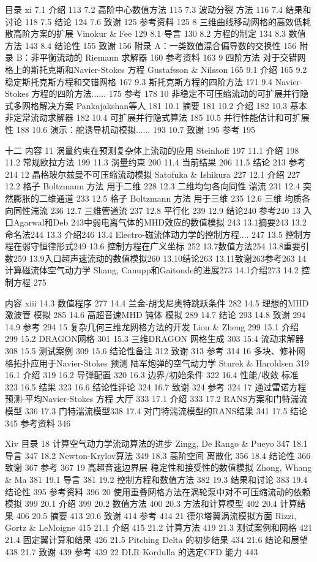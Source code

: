\documentclass[UTF8,11pt,a4paper,openany,fontset=fandol]{ctexbook}
\begin{document}
目录 xi 7.1 介绍 113 7.2 高阶中心数值方法 115 7.3 波动分裂 方法 116 7.4 结果和讨论 118 7.5 结论 124 7.6 致谢 125 参考资料 125 8 三维曲线移动网格的高效低耗散高阶方案的扩展 Vinokur \& Fee 129 8.1 导言 130 8.2 方程的制定 134 8.3 数值方法 143 8.4 结论性 155 致谢 156 附录 A：一类数值混合偏导数的交换性 156 附录 B：非平衡流动的 Riemann 求解器 160 参考资料 163 9 四阶方法 对于交错网格上的斯托克斯和Navier-Stokes 方程 Gustafsson \& Nilsson 165 9.1 介绍 165 9.2 稳定斯托克斯方程和交错网格 167 9.3 斯托克斯方程的四阶方法 171 9.4 Navier-Stokes 方程的四阶方法...... 175 参考 178 10 非稳定不可压缩流动的可扩展并行隐式多网格解决方案 Pankajakshan等人 181 10.1 摘要 181 10.2 介绍 182 10.3 基本非定常流动求解器 182 10.4 可扩展并行隐式算法 185 10.5 并行性能估计和可扩展性 188 10.6 演示：舵诱导机动模拟...... 193 10.7 致谢 195 参考 195

十二 内容 11 涡量约束在预测复杂体上流动的应用 Steinhoff 197 11.1 介绍 198 11.2 常规欧拉方法 199 11.3 涡量约束 200 11.4 当前结果 206 11.5 结论 213 参考 214 12 晶格玻尔兹曼不可压缩流动模拟 Satofuka \& Ishikura 227 12.1 介绍 227 12.2 格子 Boltzmann 方法 用于二维 228 12.3 二维均匀各向同性 湍流 231 12.4 突然膨胀的二维通道 233 12.5 格子 Boltzmann 方法 用于三维 235 12.6 三维 均质各向同性湍流 236 12.7 三维管道流 237 12.8 平行化 239 12.9 结论240 参考240 13 入口Agarwal和Deb 243中弱电离气体的MHD效应的数值模拟 243 13.1摘要243 13.2命名法244 13.3 介绍246 13.4 Electro-磁流体动力学的控制方程.... 247 13.5 控制方程在弱守恒律形式249 13.6 控制方程在广义坐标 252 13.7数值方法254 13.8重要引数259 13.9入口超声速流动的数值模拟260 13.10结论263 13.11致谢263参考263 14 计算磁流体空气动力学 Shang, Canupp和Gaitonde的进展273 14.1介绍273 14.2 控制方程 275

内容 xiii 14.3 数值程序 277 14.4 兰金-胡戈尼奥特跳跃条件 282 14.5 理想的MHD 激波管 模拟 285 14.6 高超音速MHD 钝体 模拟 289 14.7 结论 293 14.8 致谢 294 14.9 参考 294 15 复杂几何三维龙网格方法的开发 Liou \& Zheng 299 15.1 介绍 299 15.2 DRAGON网格 301 15.3 三维DRAGON 网格生成 303 15.4 流动求解器 308 15.5 测试案例 309 15.6 结论性备注 312 致谢 313 参考 314 16 多块、修补网格拓扑应用于Navier-Stokes 预测 陆军炮弹的空气动力学 Sturek \& Haroldsen 319 16.1 介绍 319 16.2 导弹配置 320 16.3 边界/初始条件 322 16.4 性能/收敛 标准 323 16.5 结果 323 16.6 结论性评论 324 16.7 致谢 324 参考 324 17 通过雷诺方程预测-平均Navier-Stokes 方程 大厅 333 17.1 介绍 333 17.2 RANS方案和门特湍流模型 336 17.3 门特湍流模型338 17.4 对门特湍流模型的RANS结果 341 17.5 结论 345 参考资料 346

Xiv 目录 18 计算空气动力学流动算法的进步 Zingg, De Rango \& Pueyo 347 18.1 导言 347 18.2 Newton-Krylov算法 349 18.3 高阶空间 离散化 356 18.4 结论性 366 致谢 367 参考 367 19 高超音速边界层 稳定性和接受性的数值模拟 Zhong, Whang \& Ma 381 19.1 导言 381 19.2 控制方程和数值方法 382 19.3 结果和讨论 383 19.4 结论性 395 参考资料 396 20 使用重叠网格方法在涡轮泵中对不可压缩流动的依赖模拟 399 20.1 介绍 399 20.2 数值方法 400 20.3 方法和计算模型 402 20.4 计算结果 406 20.5 摘要 413 20.6 致谢 414 参考 414 21 德尔塔翼涡流模拟方面 Rizzi, Gortz \& LeMoigne 415 21.1 介绍 415 21.2 计算方法 419 21.3 测试案例和网格 421 21.4 固定翼计算和结果 426 21.5 Pitching Delta 的初步结果 434 21.6 结论和展望 438 21.7 致谢 439 参考 439 22 DLR Kordulla 的选定CFD 能力 443
\end{document}
